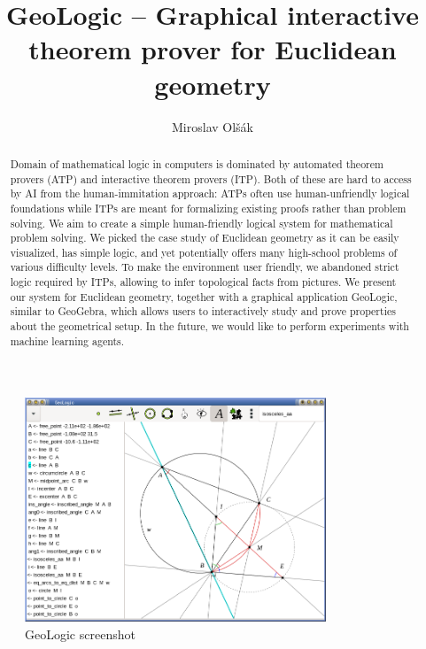 \documentclass[runningheads]{llncs}
\begin{document}
\title{GeoLogic -- Graphical interactive theorem prover for Euclidean geometry}
%
%
\author{Miroslav Ol\v s\'ak}
%
%
%
\maketitle              %
%
\begin{abstract}
Domain of mathematical logic in computers is dominated by
automated theorem provers (ATP) and interactive theorem provers (ITP).
Both of these are hard to  access by AI from the human-immitation
approach: ATPs often use human-unfriendly logical foundations while ITPs
are meant for formalizing existing proofs rather than problem solving.
We aim to create a simple human-friendly logical system for mathematical
problem solving. We picked the case study of Euclidean geometry as it
can be easily visualized, has simple logic, and yet potentially offers
many high-school problems of various difficulty levels. To make the
environment user friendly, we abandoned strict logic required by ITPs,
allowing to infer topological facts from pictures. We present our system
for Euclidean geometry, together with a graphical application GeoLogic,
similar to GeoGebra, which allows users to interactively study and prove
properties about the geometrical setup. In the future, we would like to
perform experiments with machine learning agents.
\end{abstract}

\begin{figure}
  \centering
  \includegraphics[width = 9cm]{screenshot.png}%
  \caption{GeoLogic screenshot}
\end{figure}
\end{document}
